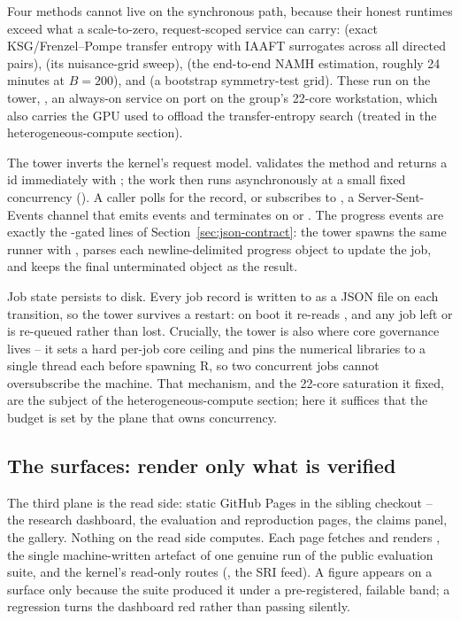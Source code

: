 Four methods cannot live on the synchronous path, because their honest runtimes
exceed what a scale-to-zero, request-scoped service can carry: 
(exact KSG/Frenzel--Pompe transfer entropy with IAAFT surrogates across all
directed pairs),  (its nuisance-grid sweep),
 (the end-to-end NAMH estimation, roughly 24 minutes at
$B=200$), and  (a bootstrap symmetry-test grid). These run
on the tower, , an always-on service on port
 on the group's 22-core workstation, which also carries the GPU used to
offload the transfer-entropy search (treated in the heterogeneous-compute section).

The tower inverts the kernel's request model. 
validates the method and returns a  id immediately with
; the work then runs asynchronously at a small fixed concurrency
(). A caller polls  for the
record, or subscribes to , a Server-Sent-Events
channel that emits  events and terminates on  or
. The progress events are exactly the -gated lines of
Section~\ref{sec:json-contract}: the tower spawns the same runner with
, parses each newline-delimited progress object to update the
job, and keeps the final unterminated object as the result.

Job state persists to disk. Every job record is written to  as a JSON
file on each transition, so the tower survives a restart: on boot it re-reads
, and any job left  or  is re-queued rather
than lost. Crucially, the tower is also where core governance lives -- it sets a
hard per-job core ceiling and pins the numerical libraries to a single thread each
before spawning R, so two concurrent jobs cannot oversubscribe the machine. That
mechanism, and the 22-core saturation it fixed, are the subject of the
heterogeneous-compute section; here it suffices that the budget is set by the plane
that owns concurrency.

\subsection{The surfaces: render only what is verified}
\label{sec:surfaces}

The third plane is the read side: static GitHub Pages in the sibling
 checkout -- the research dashboard, the evaluation and
reproduction pages, the claims panel, the gallery. Nothing on the read side
computes. Each page fetches and renders , the single
machine-written artefact of one genuine run of the public evaluation suite, and the
kernel's read-only routes (, the SRI feed). A figure appears on a
surface only because the suite produced it under a pre-registered, failable band; a
regression turns the dashboard red rather than passing silently.

